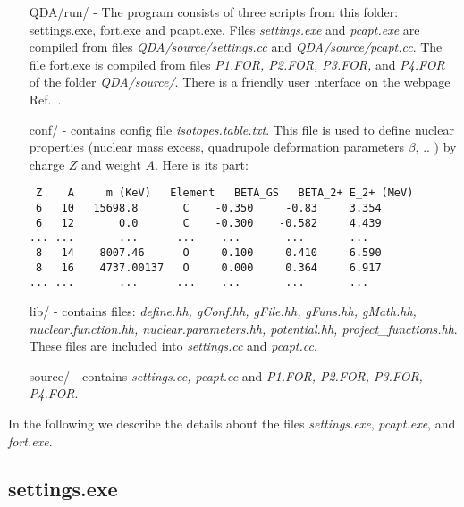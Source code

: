 \documentclass[preprint,review,12pt]{elsarticle}
\begin{document}
  \begin{itemize}
    \setlength\itemsep{0em}
    \item[QDA/run/]    - The program consists of three scripts from this folder: settings.exe, fort.exe and pcapt.exe. Files \textit{settings.exe} and \textit{pcapt.exe} are compiled from files \textit{QDA/source/settings.cc} and \textit{QDA/source/pcapt.cc}. The file fort.exe is compiled from files \textit{P1.FOR, P2.FOR, P3.FOR,} and \textit{P4.FOR} of the folder \textit{QDA/source/}. There is a friendly user interface on the webpage Ref.~\cite{WebInterface}.
    \item[conf/]   - contains config file \textit{isotopes.table.txt}. This file is used to define nuclear properties
    (nuclear mass excess, quadrupole deformation parameters $\beta$, .. ) by charge $Z$ and weight $A$. Here is its part:
\begin{verbatim}
 Z    A     m (KeV)   Element   BETA_GS   BETA_2+ E_2+ (MeV)
 6   10   15698.8       C    -0.350     -0.83     3.354
 6   12       0.0       C    -0.300    -0.582     4.439
... ...       ...      ...    ...       ...       ...
 8   14    8007.46      O     0.100     0.410     6.590
 8   16    4737.00137   O     0.000     0.364     6.917
... ...       ...      ...    ...       ...       ...
\end{verbatim}
    \item[lib/]    - contains files: \textit{define.hh, gConf.hh, gFile.hh, gFuns.hh, gMath.hh,} \\ \textit{nuclear.function.hh, nuclear.parameters.hh, potential.hh, project\_functions.hh}. These files are included into \textit{settings.cc} and \textit{pcapt.cc}.
    \item[source/] - contains \textit{settings.cc, pcapt.cc} and \textit{P1.FOR, P2.FOR, P3.FOR, P4.FOR}.
  \end{itemize}

 In the following we describe the details about the files \textit{settings.exe}, \textit{pcapt.exe}, and 
 \textit{fort.exe}.



  \subsection{settings.exe}
  \label{sec:settings}
\end{document}
